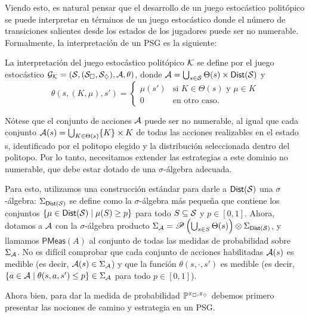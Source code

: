 Viendo esto, es natural pensar que el desarrollo de un juego estocástico
politópico se puede interpretar en términos de un juego estocástico donde el
número de transiciones salientes desde los estados de los jugadores puede ser
no numerable. Formalmente, la interpretación de un PSG es la siguiente:

\begin{definition}
	La interpretación del juego estocástico politópico \( \mathcal{K} \) se define por el juego estocástico \( \mathcal{G}_{\mathcal{K}} = (\mathcal{S}, (\mathcal{S}_\square, \mathcal{S}_\diamondsuit), \mathcal{A}, \theta) \), donde \( \mathcal{A} = \bigcup_{s \in \mathcal{S}} \Theta(s) \times \textsf{Dist}(\mathcal{S}) \) y
	\[
		\theta(s, (K, \mu), s') =
		\begin{cases}
			\mu(s') & \text{si } K \in \Theta(s) \text{ y } \mu \in K \\
			0 & \text{en otro caso}.
		\end{cases}
	\]
\end{definition}

Nótese que el conjunto de acciones \( \mathcal{A} \) puede ser no numerable, al igual
que cada conjunto \( \mathcal{A}(s) = \bigcup_{K \in \Theta(s)} \{K\} \times K \) de
todas las acciones realizables en el estado s, identificado por el politopo
elegido y la distribución seleccionada dentro del politopo. Por lo tanto,
necesitamos extender las estrategias a este dominio no numerable, que debe
estar dotado de una \( \sigma \)-álgebra adecuada.

Para esto, utilizamos una construcción estándar para darle a \(
\textsf{Dist}(\mathcal{S}) \) una \( \sigma \)-álgebra: \( \Sigma_{\textsf{Dist}(\mathcal{S})}
\) se define como la \( \sigma \)-álgebra más pequeña que contiene los
conjuntos \( \{\mu \in \textsf{Dist}(\mathcal{S}) \mid \mu(S) \geq p\} \) para todo \(
S \subseteq \mathcal{S} \) y \( p \in [0, 1] \). Ahora, dotamos a \( \mathcal{A} \) con la \(
\sigma \)-álgebra producto \( \Sigma_{\mathcal{A}} = \mathscr{P} \left(\bigcup_{s \in S}
\Theta(s)\right) \otimes \Sigma_{\textsf{Dist}(\mathcal{S})} \), y llamamos \(
\textsf{PMeas}(A) \) al conjunto de todas las medidas de probabilidad sobre \(
\Sigma_{\mathcal{A}} \). No es difícil comprobar que cada conjunto de acciones
habilitadas \( \mathcal{A}(s) \) es medible (es decir, \( \mathcal{A}(s) \in \Sigma_{\mathcal{A}} \))
y que la función \( \theta(s, \cdot, s') \) es medible (es decir, \( \{a \in
\mathcal{A} \mid \theta(s, a, s') \leq p\} \in \Sigma_{\mathcal{A}} \) para todo \( p \in [0,
	1] \)).

Ahora bien, para dar la medida de probabilidad $\mathbb{P}^{\pi_\square, \pi_\diamondsuit}$
debemos primero presentar las nociones de camino y estrategia en un PSG.

